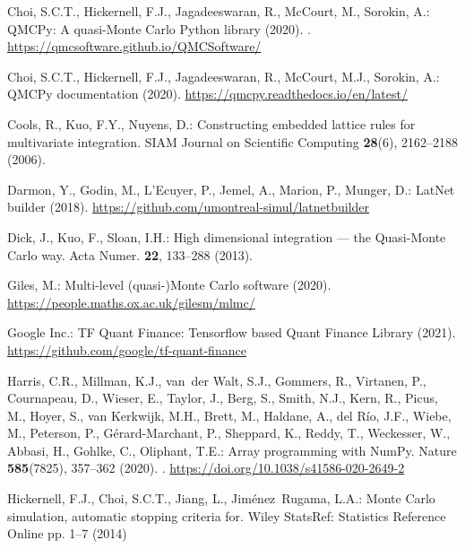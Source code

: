 \documentclass[graybox]{svmult}
\begin{document}
\begin{thebibliography}{10}
Choi, S.C.T., Hickernell, F.J., Jagadeeswaran, R., McCourt, M., Sorokin, A.:
  {QMCPy}: A quasi-{M}onte {C}arlo {P}ython library (2020).
\newblock {}.
\newblock \urlprefix\url{https://qmcsoftware.github.io/QMCSoftware/}

Choi, S.C.T., Hickernell, F.J., Jagadeeswaran, R., McCourt, M.J., Sorokin,
  A.: {QMCPy} documentation (2020).
\newblock \urlprefix\url{https://qmcpy.readthedocs.io/en/latest/}

Cools, R., Kuo, F.Y., Nuyens, D.: Constructing embedded lattice rules for
  multivariate integration.
\newblock SIAM Journal on Scientific Computing \textbf{28}(6), 2162--2188
  (2006).
\newblock {}

Darmon, Y., Godin, M., L'Ecuyer, P., Jemel, A., Marion, P., Munger, D.:
  {LatNet} builder (2018).
\newblock \urlprefix\url{https://github.com/umontreal-simul/latnetbuilder}

Dick, J., Kuo, F., Sloan, I.H.: High dimensional integration --- the
  {Q}uasi-{M}onte {C}arlo way.
\newblock Acta Numer. \textbf{22}, 133--288 (2013).
\newblock {}

Giles, M.: Multi-level (quasi-){M}onte {C}arlo software (2020).
\newblock \urlprefix\url{https://people.maths.ox.ac.uk/gilesm/mlmc/}

{Google Inc.}: {TF Quant Finance}: Tensorflow based {Q}uant {F}inance {L}ibrary
  (2021).
\newblock \urlprefix\url{https://github.com/google/tf-quant-finance}

Harris, C.R., Millman, K.J., van~der Walt, S.J., Gommers, R., Virtanen, P.,
  Cournapeau, D., Wieser, E., Taylor, J., Berg, S., Smith, N.J., Kern, R.,
  Picus, M., Hoyer, S., van Kerkwijk, M.H., Brett, M., Haldane, A., del
  R{\'{i}}o, J.F., Wiebe, M., Peterson, P., G{\'{e}}rard-Marchant, P.,
  Sheppard, K., Reddy, T., Weckesser, W., Abbasi, H., Gohlke, C., Oliphant,
  T.E.: Array programming with {NumPy}.
\newblock Nature \textbf{585}(7825), 357--362 (2020).
\newblock {}.
\newblock \urlprefix\url{https://doi.org/10.1038/s41586-020-2649-2}

Hickernell, F.J., Choi, S.C.T., Jiang, L., Jim{\'e}nez~Rugama, L.A.: {M}onte
  {C}arlo simulation, automatic stopping criteria for.
\newblock Wiley StatsRef: Statistics Reference Online pp. 1--7 (2014)


\end{thebibliography}
\end{document}
